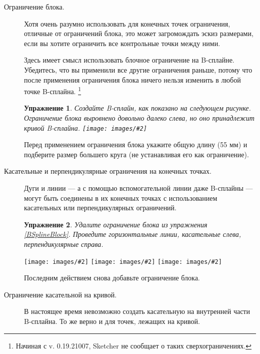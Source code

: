 \documentclass[12pt,titlepage]{article}
\newcommand{\iconSmall}[1]{\raisebox{-2ex}{\texttt{[image: images/\#1]}}}
\newcommand{\img}[2]{\vspace{2ex}\noindent\texttt{[image: images/\#2]}}
\newtheorem{Exercise}{Упражнение}
\newcommand{\currentVersion}{0.19.21007}
\begin{document}
\begin{description}
\item [Ограничение блока.]
Хотя очень разумно использовать для конечных точек ограничения, отличные от ограничений блока, это может загромождать эскиз размерами, если вы хотите ограничить все контрольные точки между ними.

Здесь имеет смысл использовать блочное ограничение на B-сплайне. Убедитесь, что вы применили все другие ограничения раньше, потому что после применения ограничения блока ничего нельзя изменить в любой точке B-сплайна. \footnote {Начиная с v. \currentVersion {}, Sketcher не сообщает о таких сверхограничениях. }

\newlength{\listWidth}
\setlength{\listWidth}{\textwidth}
\addtolength{\listWidth}{-\leftmargini}
\begin{minipage}{\listWidth}
\begin{Exercise}
\label{BSplineBlock}
Создайте B-сплайн, как показано на следующем рисунке. Ограничение блока выровнено довольно далеко слева, но оно принадлежит кривой B-сплайна.
\img{}{BSplineBlock}
\end{Exercise}
\end{minipage}

Перед применением ограничения блока укажите общую длину (55 мм) и подберите размер большего круга (не устанавливая его как ограничение).

\item [Касательные и перпендикулярные ограничения на конечных точках.] Дуги и линии --- а с помощью вспомогательной линии даже B-сплайны --- могут быть соединены в их конечных точках с использованием касательных или перпендикулярных ограничений.

\begin{Exercise}
Удалите ограничение блока из упражнения \vref {BSplineBlock}. Проведите горизонтальные линии, касательные слева, перпендикулярные справа.
\end{Exercise}

\hspace*{-\leftmargini}\img{scale=1}{BSplineTangent}%
\hfill%
\raisebox{1cm}{$\stackrel{\iconSmall{Constraint_Tangent}}{\longrightarrow}$}%
\hfill%
\img{scale=1}{BSplinePerpendicular}%
\hfill%
\raisebox{1cm}{$\stackrel{\iconSmall{Constraint_Perpendicular}}{\longrightarrow}$}
\hfill%
\img{scale=1}{BSplineTangentPerpendicular}%

Последним действием снова добавьте ограничение блока.


\item [Ограничение касательной на кривой.] В настоящее время невозможно создать касательную на внутренней части B-сплайна. То же верно и для точек, лежащих на кривой.
      

\end{description}
\end{document}
